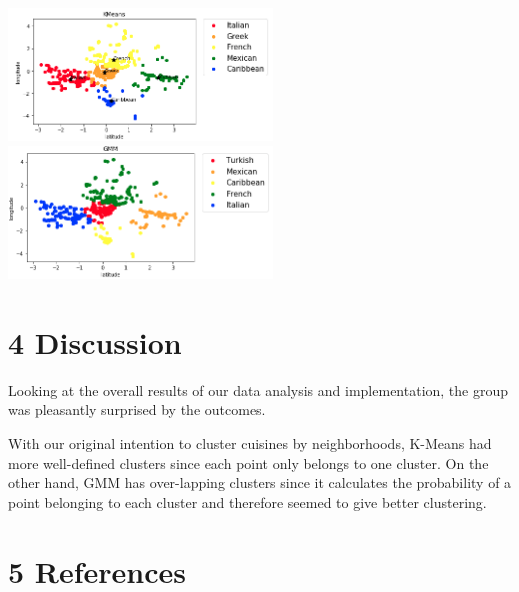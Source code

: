 \documentclass{neu_handout}
\begin{document}
\begin{center}
\includegraphics[width=70mm,scale=0.5]{kmeans}
\includegraphics[width=70mm,scale=0.5]{gmm}
\end{center}


\section*{4 Discussion}

Looking at the overall results of our data analysis and implementation, the group was pleasantly surprised by the outcomes.

With our original intention to cluster cuisines by neighborhoods, K-Means had more well-defined clusters since each point only belongs to one cluster. On the other hand, GMM has over-lapping clusters since it calculates the probability of a point belonging to each cluster and therefore seemed to give better clustering.


\section*{5 References}
\end{document}

